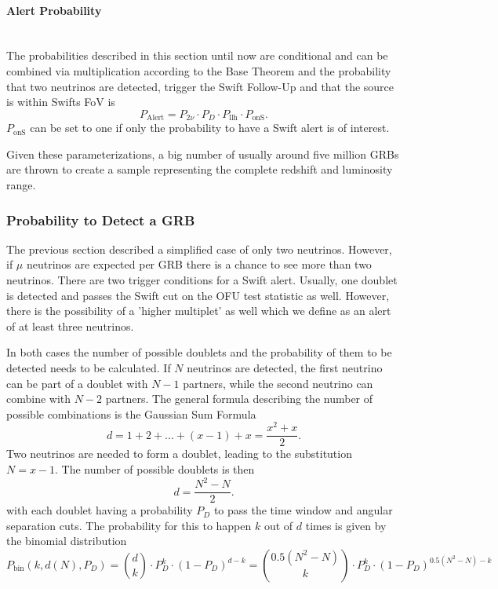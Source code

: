 \paragraph{Alert Probability}$\;$\\
The probabilities described in this section until now are conditional and can 
be 
combined via multiplication according to the Base Theorem and the probability 
that two neutrinos are detected, trigger the Swift Follow-Up and that the 
source is within Swifts FoV is
\begin{equation}
 P_\text{Alert} = P_{2\nu} \cdot P_D \cdot P_\text{llh} \cdot P_\text{onS}.
\end{equation}
$P_\text{onS}$ can be set to one if only the probability to have a Swift
alert is of interest.

Given these parameterizations, a big number of usually around five 
million GRBs are thrown to create a sample representing the complete redshift 
and luminosity range.



\subsubsection{Probability to Detect a GRB}
The previous section described a simplified case of only two neutrinos. 
However, if $\mu$ neutrinos are expected per GRB there is a chance to see more 
than two neutrinos. There are two trigger conditions for a Swift alert. 
Usually, one doublet is 
detected and passes the Swift cut on the OFU test statistic as 
well. However, there is the 
possibility of a 'higher multiplet' as well which we define as an alert of at 
least three neutrinos.

In both cases the number of possible 
doublets and the probability of them to be detected needs to be calculated. If 
$N$ neutrinos are detected, the first neutrino can be part of a doublet with 
$N-1$ partners, while the second neutrino can combine with $N-2$ partners. The 
general formula describing the number of possible combinations is the Gaussian 
Sum Formula
\begin{equation}
 d = 1 + 2 + ... + (x-1) + x= \frac{x^2 + x}{2}.
\end{equation}
Two neutrinos are needed to form a doublet, leading to the substitution $N = 
x-1$. The number of possible doublets is then 
\begin{equation}
 d = \frac{N^2 - N}{2}.
\end{equation}
with each doublet having a probability $P_D$ to pass the time window and 
angular separation cuts. The probability for this to happen $k$ out of $d$ 
times is given by the binomial distribution
\begin{equation}
 P_\text{bin} ( k, d(N), P_D) =  \binom{d}{k} \cdot P_{D}^k \cdot 
(1 - P_{D})^{d-k} = \binom{0.5 (N^2 - N)}{k} \cdot P_{D}^k \cdot 
(1 - P_{D})^{0.5(N^2 -N) -k}
\end{equation}

